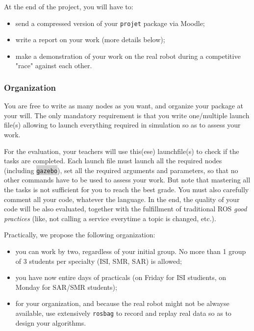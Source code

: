 \documentclass[10pt,a4paper,printanswers]{upmc}
\newcommand{\mytext}[1]{\colorbox{lightgray}{\texttt{#1}}}
\begin{document}
At the end of the project, you will have to:
\begin{itemize}
  \itemsep=-1pt
  \item send a compressed version of your \texttt{projet} package via Moodle;
  \item write a report on your work (more details below);
  \item make a demonstration of your work on the real robot during a competitive "race" against each
        other.
\end{itemize}

\subsubsection{Organization}
%
\begin{mdframed}[style=graybox]
  You are free to write as many nodes as you want, and organize your package at your will. The only
  mandatory requirement is that you write one/multiple launch file(s) allowing to launch everything
  required in simulation so as to assess your work.
\end{mdframed}
%
For the evaluation, your teachers will use this(ese) launchfile(s) to check if the tasks are
completed. Each launch file must launch all the required nodes (including \mytext{gazebo}),
set all the required arguments and parameters, so that no other commands have to be used to assess
your work.
But note that mastering all the tasks is not sufficient for you to reach the best grade. You must
also carefully comment all your code, whatever the language. In the end, the quality of your code
will be also evaluated, together with the fulfillment of traditional ROS \emph{good practices}
(like, not calling a service everytime a topic is changed, etc.).

\noindent Practically, we propose the following organization:
\begin{itemize}
  \itemsep=-1pt
  \item you can work by two, regardless of your initial group. No more than 1 group of 3 students
        per specialty (ISI, SMR, SAR) is allowed;
  \item you have now entire days of practicals (on Friday for ISI studients, on Monday for
        SAR/SMR students);
  \item for your organization, and because the real robot might not be alwayse available, use
        extensively \texttt{rosbag} to record and replay real data so as to design your algorithms.
\end{itemize}
\end{document}
